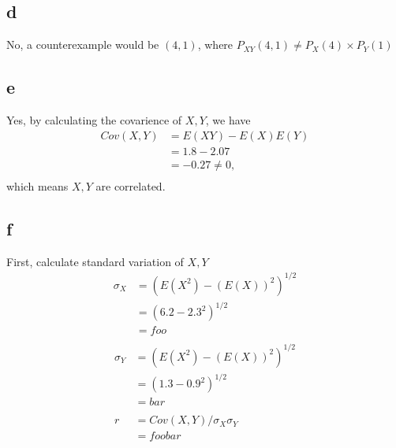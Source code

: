 \documentclass[12pt,letterpaper]{article}
\begin{document}
    \subsection*{d}
        No, a counterexample would be $(4, 1)$, where $P_{XY}(4, 1) \not= P_{X}(4) \times P_{Y}(1)$
    \subsection*{e}
        Yes, by calculating the covarience of $X, Y$, we have
        \begin{equation*}
            \begin{aligned}
                Cov(X, Y) &= E(XY) - E(X)E(Y) \\
                &= 1.8 - 2.07 \\
                &= -0.27 \not= 0, \\
            \end{aligned}
        \end{equation*}
        which means $X, Y$ are correlated.
    \subsection*{f}
        First, calculate standard variation of $X, Y$
        \begin{equation*}
            \begin{aligned}
                \sigma_{X} &= (E(X^{2}) - (E(X))^{2})^{1/2} \\
                &= (6.2 - 2.3^{2})^{1/2} \\
                &= foo \\
            \end{aligned}
        \end{equation*}
        \begin{equation*}
            \begin{aligned}
                \sigma_{Y} &= (E(X^{2}) - (E(X))^{2})^{1/2} \\
                &= (1.3 - 0.9^{2})^{1/2} \\
                &= bar \\
                \\
                r &= Cov(X, Y) / \sigma_{X}\sigma_{Y} \\
                &= foobar \\
            \end{aligned}
        \end{equation*}
\end{document}
